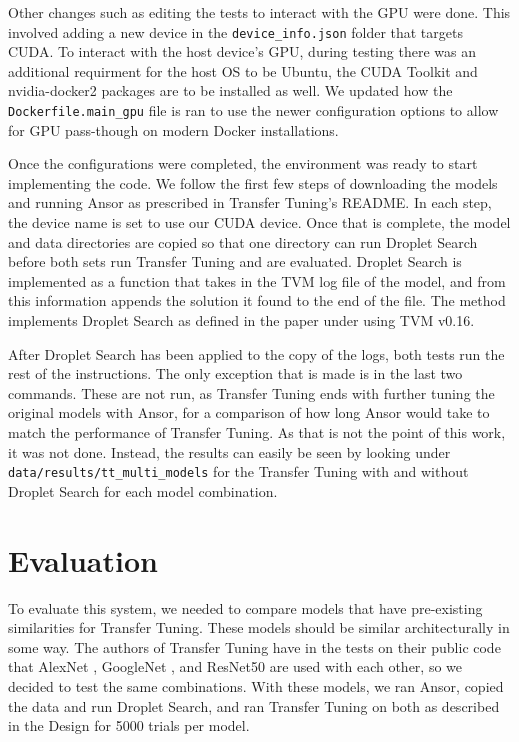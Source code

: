\documentclass[conference]{IEEEtran}
\begin{document}
Other changes such as editing the tests to interact with the GPU were done. This involved adding a new device in the \lstinline{device_info.json} folder that targets CUDA. To interact with the host device's GPU, during testing there was an additional requirment for the host OS to be Ubuntu, the CUDA Toolkit and nvidia-docker2 packages are to be installed as well. We updated how the \lstinline{Dockerfile.main_gpu} file is ran to use the newer configuration options to allow for GPU pass-though on modern Docker installations. 

Once the configurations were completed, the environment was ready to start implementing the code. We follow the first few steps of downloading the models and running Ansor as prescribed in Transfer Tuning's README. In each step, the device name is set to use our CUDA device. Once that is complete, the model and data directories are copied so that one directory can run Droplet Search before both sets run Transfer Tuning and are evaluated. Droplet Search is implemented as a function that takes in the TVM log file of the model, and from this information appends the solution it found to the end of the file. The method implements Droplet Search as defined in the paper under using TVM v0.16. 

After Droplet Search has been applied to the copy of the logs, both tests run the rest of the instructions. The only exception that is made is in the last two commands. These are not run, as Transfer Tuning ends with further tuning the original models with Ansor, for a comparison of how long Ansor would take to match the performance of Transfer Tuning. As that is not the point of this work, it was not done. Instead, the results can easily be seen by looking under \lstinline{data/results/tt_multi_models} for the Transfer Tuning with and without Droplet Search for each model combination.  

\section{Evaluation}
To evaluate this system, we needed to compare models that have pre-existing similarities for Transfer Tuning. These models should be similar architecturally in some way. The authors of Transfer Tuning have in the tests on their public code that AlexNet \cite{krizhevsky_imagenet_2012}, GoogleNet \cite{szegedy_going_2015}, and ResNet50 \cite{he_deep_2015} are used with each other, so we decided to test the same combinations. With these models, we ran Ansor, copied the data and run Droplet Search, and ran Transfer Tuning on both as described in the Design for 5000 trials per model.
\end{document}
